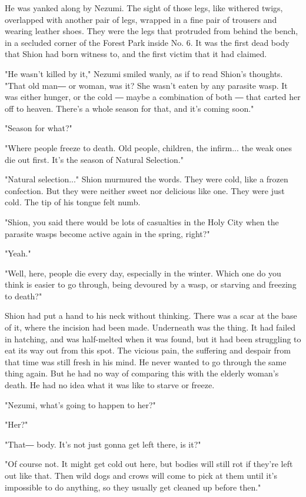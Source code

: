 He was yanked along by Nezumi. The sight of those legs, like withered
twigs, overlapped with another pair of legs, wrapped in a fine pair of
trousers and wearing leather shoes. They were the legs that protruded
from behind the bench, in a secluded corner of the Forest Park inside
No. 6. It was the first dead body that Shion had born witness to, and
the first victim that it had claimed.

"He wasn't killed by it," Nezumi smiled wanly, as if to read Shion's
thoughts. "That old man― or woman, was it? She wasn't eaten by any
parasite wasp. It was either hunger, or the cold ― maybe a combination
of both ― that carted her off to heaven. There's a whole season for
that, and it's coming soon."

"Season for what?"

"Where people freeze to death. Old people, children, the infirm... the
weak ones die out first. It's the season of Natural Selection."

"Natural selection..." Shion murmured the words. They were cold, like a
frozen confection. But they were neither sweet nor delicious like one.
They were just cold. The tip of his tongue felt numb.

"Shion, you said there would be lots of casualties in the Holy City when
the parasite wasps become active again in the spring, right?"

"Yeah."

"Well, here, people die every day, especially in the winter. Which one
do you think is easier to go through, being devoured by a wasp, or
starving and freezing to death?"

Shion had put a hand to his neck without thinking. There was a scar at
the base of it, where the incision had been made. Underneath was the
thing. It had failed in hatching, and was half-melted when it was found,
but it had been struggling to eat its way out from this spot. The
vicious pain, the suffering and despair from that time was still fresh
in his mind. He never wanted to go through the same thing again. But he
had no way of comparing this with the elderly woman's death. He had no
idea what it was like to starve or freeze.

"Nezumi, what's going to happen to her?"

"Her?"

"That― body. It's not just gonna get left there, is it?"

"Of course not. It might get cold out here, but bodies will still rot if
they're left out like that. Then wild dogs and crows will come to pick
at them until it's impossible to do anything, so they usually get
cleaned up before then."

